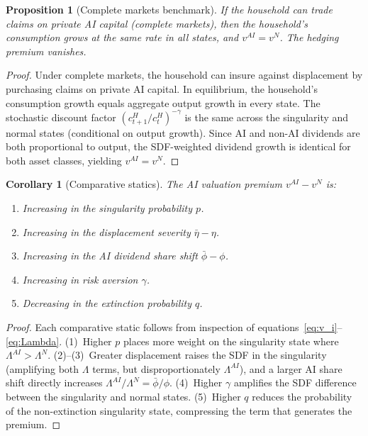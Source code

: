 \documentclass[12pt]{article}
\newtheorem{proposition}{Proposition}
\newtheorem{corollary}{Corollary}
\begin{document}
\begin{proposition}[Complete markets benchmark] \label{prop:complete}
If the household can trade claims on private AI capital (complete markets), then the household's consumption grows at the same rate in all states, and $v^{AI} = v^{N}$. The hedging premium vanishes.
\end{proposition}

\begin{proof}
Under complete markets, the household can insure against displacement by purchasing claims on private AI capital. In equilibrium, the household's consumption growth equals aggregate output growth in every state. The stochastic discount factor $(c_{t+1}^H / c_t^H)^{-\gamma}$ is the same across the singularity and normal states (conditional on output growth). Since AI and non-AI dividends are both proportional to output, the SDF-weighted dividend growth is identical for both asset classes, yielding $v^{AI} = v^{N}$.
\end{proof}

\begin{corollary}[Comparative statics] \label{cor:comp_statics}
The AI valuation premium $v^{AI} - v^{N}$ is:
\begin{enumerate}
    \item Increasing in the singularity probability $p$.
    \item Increasing in the displacement severity $\bar{\eta} - \eta$.
    \item Increasing in the AI dividend share shift $\bar{\phi} - \phi$.
    \item Increasing in risk aversion $\gamma$.
    \item Decreasing in the extinction probability $q$.
\end{enumerate}
\end{corollary}

\begin{proof}
Each comparative static follows from inspection of equations~\eqref{eq:v_i}--\eqref{eq:Lambda}. (1)~Higher $p$ places more weight on the singularity state where $\Lambda^{AI} > \Lambda^N$. (2)--(3)~Greater displacement raises the SDF in the singularity (amplifying both $\Lambda$ terms, but disproportionately $\Lambda^{AI}$), and a larger AI share shift directly increases $\Lambda^{AI}/\Lambda^N = \bar{\phi}/\phi$. (4)~Higher $\gamma$ amplifies the SDF difference between the singularity and normal states. (5)~Higher $q$ reduces the probability of the non-extinction singularity state, compressing the term that generates the premium.
\end{proof}
\end{document}
